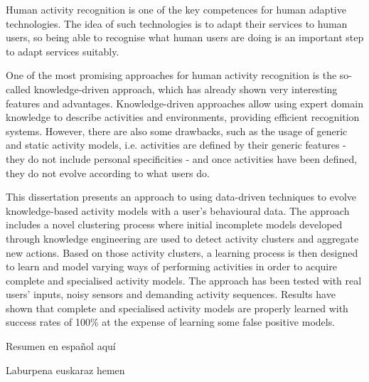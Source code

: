




\begin{abstracts}        %

Human activity recognition is one of the key competences for human adaptive technologies. The idea of such technologies is to adapt their services to human users, so being able to recognise what human users are doing is an important step to adapt services suitably. 

One of the most promising approaches for human activity recognition is the so-called knowledge-driven approach, which has already shown very interesting features and advantages. Knowledge-driven approaches allow using expert domain knowledge to describe activities and environments, providing efficient recognition systems. However, there are also some drawbacks, such as the usage of generic and static activity models, i.e. activities are defined by their generic features - they do not include personal specificities - and once activities have been defined, they do not evolve according to what users do.

This dissertation presents an approach to using data-driven techniques to evolve knowledge-based activity models with a user's behavioural data. The approach includes a novel clustering process where initial incomplete models developed through knowledge engineering are used to detect activity clusters and aggregate new actions. Based on those activity clusters, a learning process is then designed to learn and model varying ways of performing activities in order to acquire complete and specialised activity models. The approach has been tested with real users' inputs, noisy sensors and demanding activity sequences. Results have shown that complete and specialised activity models are properly learned with success rates of 100\% at the expense of learning some false positive models.

\end{abstracts}

\begin{resumen}        %

Resumen en espa\~nol aqu\'i


\end{resumen}

\begin{laburpena}        %
 
 Laburpena euskaraz hemen
 
\end{laburpena}





